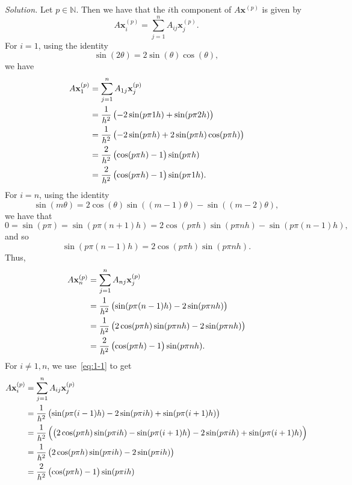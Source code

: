 \documentclass{article}
\def\*#1{\mathbf{#1}}
\newcommand{\N}{\mathbb{N}}
\begin{document}
\textit{Solution.}
Let $p \in \N$. Then we have that the $i$th component of $A \*x^{(p)}$ is given by
%
\begin{equation*}
    A \*x^{(p)}_i
    = \sum_{j = 1}^n A_{ij} \*x^{(p)}_j
    .
\end{equation*}
%
For $i = 1$, using the identity
%
\begin{equation*}
    \sin(2 \theta) = 2 \sin(\theta) \cos(\theta)
    ,
\end{equation*}
%
we have
%
\begin{align*}
    A \*x^{(p)}_1
    &= \sum_{j = 1}^n A_{1j} \*x^{(p)}_j \\
    &= \frac{1}{h^2} \del{-2 \sin(p \pi 1 h) + \sin(p \pi 2 h)} \\
    &= \frac{1}{h^2} \del{-2 \sin(p \pi h) + 2 \sin(p \pi h) \cos(p \pi h)} \\
    &= \frac{2}{h^2} \del{\cos(p \pi h) - 1} \sin(p \pi h) \\
    &= \frac{2}{h^2} \del{\cos(p \pi h) - 1} \sin(p \pi 1 h)
    .
\end{align*}
%
For $i = n$, using the identity
%
\begin{equation}
    \sin(m \theta) = 2 \cos(\theta) \sin((m - 1) \theta) - \sin((m - 2) \theta)
    \label{eq:1-1}
    ,
\end{equation}
%
we have that
%
\begin{equation*}
    0 = \sin(p \pi) = \sin(p \pi (n + 1) h) = 2 \cos(p \pi h) \sin(p \pi n h) - \sin(p \pi (n - 1) h)
    ,
\end{equation*}
%
and so
%
\begin{equation*}
    \sin(p \pi (n - 1) h) = 2 \cos(p \pi h) \sin(p \pi n h)
    .
\end{equation*}
%
Thus,
%
\begin{align*}
    A \*x^{(p)}_n
    &= \sum_{j = 1}^n A_{nj} \*x^{(p)}_j \\
    &= \frac{1}{h^2} \del{\sin(p \pi (n - 1) h) - 2 \sin(p \pi n h)} \\
    &= \frac{1}{h^2} \del{2 \cos(p \pi h) \sin(p \pi n h) - 2 \sin(p \pi n h)} \\
    &= \frac{2}{h^2} \del{\cos(p \pi h) - 1} \sin(p \pi n h)
    .
\end{align*}
%
For $i \neq 1, n$, we use~\eqref{eq:1-1} to get
%
\begin{align*}
    A \*x^{(p)}_i
    &= \sum_{j = 1}^n A_{ij} \*x^{(p)}_j \\
    &= \frac{1}{h^2} \del{\sin(p \pi (i - 1) h) - 2 \sin(p \pi i h) + \sin(p \pi (i + 1) h)} \\
    &= \frac{1}{h^2} \del{\del{2 \cos(p \pi h) \sin(p \pi i h) - \sin(p \pi (i + 1) h} - 2 \sin(p \pi i h) + \sin(p \pi (i + 1) h)} \\
    &= \frac{1}{h^2} \del{2 \cos(p \pi h) \sin(p \pi i h) - 2 \sin(p \pi i h)} \\
    &= \frac{2}{h^2} \del{\cos(p \pi h) - 1} \sin(p \pi i h)
\end{align*}
\end{document}
